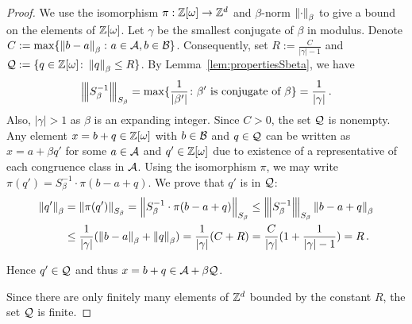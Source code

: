 \begin{proof}
We use the isomorphism $\pi:\mathbb{Z}[\omega] \rightarrow \mathbb{Z}^{d}$ and $\beta$-norm $\left\lVert\cdot\right\rVert_{\beta}$ to give a bound on the elements of $\mathbb{Z}[\omega]$.
Let $\gamma$ be the smallest conjugate of $\beta$ in modulus. 
 Denote $C:=\max\{\left\lVert b-a\right\rVert_{\beta}\colon a \in \mathcal{A}, b \in \mathcal{B}\}$. Consequently, set $R:=\frac{C}{|\gamma|-1}$ and $\mathcal{Q}:=\{q\in\mathbb{Z}[\omega]\colon \left\lVert q\right\rVert_{\beta}\leq R\}$. By Lemma~\ref{lem:propertiesSbeta}, we have 
 $$
 {\left\vert\kern-0.25ex\left\vert\kern-0.25ex\left\vert S_\beta^{-1}\right\vert\kern-0.25ex\right\vert\kern-0.25ex\right\vert}_{S_\beta}=\max \{\frac{1}{|\beta'|} \colon \beta' \text{ is conjugate of } \beta\}=\frac{1}{|\gamma|}\,.
 $$ 
 Also, $|\gamma|>1$ as $\beta$ is an expanding integer.  Since $C>0$, the set $\mathcal{Q}$ is nonempty. Any element $x=b+q \in \mathbb{Z}[\omega]$ with $b\in\mathcal{B}$ and $q\in\mathcal{Q}$ can be written as $x=a+\beta q'$ for some $a\in\mathcal{A}$  and $q'\in\mathbb{Z}[\omega]$ due to existence of a representative of each congruence class in $\mathcal{A}$. Using the isomorphism $\pi$, we may write $\pi(q')=S^{-1}_\beta \cdot \pi(b-a+q)$. We prove that $q'$ is in $\mathcal{Q}$:
\begin{align*}
    \left\lVert q'\right\rVert_{\beta}&=\left\lVert\pi(q')\right\rVert_{S_\beta}=\left\lVert S^{-1}_\beta \cdot \pi(b-a+q)\right\rVert_{S_\beta}\leq {\left\vert\kern-0.25ex\left\vert\kern-0.25ex\left\vert S^{-1}_\beta\right\vert\kern-0.25ex\right\vert\kern-0.25ex\right\vert}_{S_\beta}  \left\lVert b-a+q\right\rVert_{\beta} \\
    &\leq  \frac{1}{|\gamma|} (\left\lVert b-a\right\rVert_{\beta} +\left\lVert q\right\rVert_{\beta})=\frac{1}{|\gamma|} (C+R)=\frac{C}{|\gamma|} (1+\frac{1}{|\gamma|-1}) =R\,.
\end{align*}
 
 Hence $q'\in\mathcal{Q}$ and thus  $x=b+q \in \mathcal{A} + \beta \mathcal{Q}$. 
 
 Since there are only finitely many elements of $\mathbb{Z}^{d}$ bounded by the constant $R$, the set $\mathcal{Q}$ is finite.
\end{proof}



